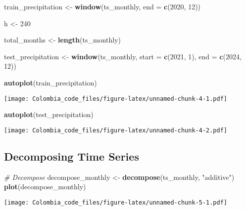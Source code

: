 \documentclass[
]{article}
\newenvironment{Shaded}{\begin{snugshade}}{\end{snugshade}}
\newcommand{\AttributeTok}[1]{\textcolor[rgb]{0.13,0.29,0.53}{#1}}
\newcommand{\CommentTok}[1]{\textcolor[rgb]{0.56,0.35,0.01}{\textit{#1}}}
\newcommand{\DecValTok}[1]{\textcolor[rgb]{0.00,0.00,0.81}{#1}}
\newcommand{\FunctionTok}[1]{\textcolor[rgb]{0.13,0.29,0.53}{\textbf{#1}}}
\newcommand{\NormalTok}[1]{#1}
\newcommand{\OtherTok}[1]{\textcolor[rgb]{0.56,0.35,0.01}{#1}}
\newcommand{\StringTok}[1]{\textcolor[rgb]{0.31,0.60,0.02}{#1}}
\begin{document}
\begin{Shaded}
\begin{Highlighting}[]
\NormalTok{train\_precipitation }\OtherTok{\textless{}{-}} \FunctionTok{window}\NormalTok{(ts\_monthly, }\AttributeTok{end =} \FunctionTok{c}\NormalTok{(}\DecValTok{2020}\NormalTok{, }\DecValTok{12}\NormalTok{))}

\NormalTok{h }\OtherTok{\textless{}{-}} \DecValTok{240}

\NormalTok{total\_months }\OtherTok{\textless{}{-}} \FunctionTok{length}\NormalTok{(ts\_monthly)}

\NormalTok{test\_precipitation }\OtherTok{\textless{}{-}} \FunctionTok{window}\NormalTok{(ts\_monthly, }\AttributeTok{start =} \FunctionTok{c}\NormalTok{(}\DecValTok{2021}\NormalTok{, }\DecValTok{1}\NormalTok{),}
    \AttributeTok{end =} \FunctionTok{c}\NormalTok{(}\DecValTok{2024}\NormalTok{, }\DecValTok{12}\NormalTok{))}

\FunctionTok{autoplot}\NormalTok{(train\_precipitation)}
\end{Highlighting}
\end{Shaded}

\texttt{[image: Colombia\_code\_files/figure-latex/unnamed-chunk-4-1.pdf]}

\begin{Shaded}
\begin{Highlighting}[]
\FunctionTok{autoplot}\NormalTok{(test\_precipitation)}
\end{Highlighting}
\end{Shaded}

\texttt{[image: Colombia\_code\_files/figure-latex/unnamed-chunk-4-2.pdf]}

\subsection{Decomposing Time Series}\label{decomposing-time-series}

\begin{Shaded}
\begin{Highlighting}[]
\CommentTok{\# Decompose}
\NormalTok{decompose\_monthly }\OtherTok{\textless{}{-}} \FunctionTok{decompose}\NormalTok{(ts\_monthly, }\StringTok{"additive"}\NormalTok{)}
\FunctionTok{plot}\NormalTok{(decompose\_monthly)}
\end{Highlighting}
\end{Shaded}

\texttt{[image: Colombia\_code\_files/figure-latex/unnamed-chunk-5-1.pdf]}
\end{document}
